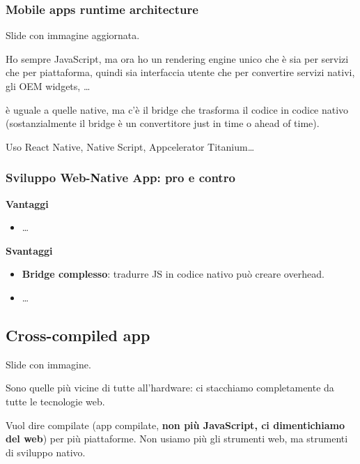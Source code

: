\subsubsection{Mobile apps runtime architecture}
\par Slide con immagine aggiornata. 
\par Ho sempre JavaScript, ma ora ho un rendering engine unico che è sia per servizi che per piattaforma, quindi sia interfaccia utente che per convertire servizi nativi, gli OEM widgets, \dots
\par è uguale a quelle native, ma c'è il bridge che trasforma il codice in codice nativo (sostanzialmente il bridge è un convertitore just in time o ahead of time).
\par Uso React Native, Native Script, Appcelerator Titanium\dots

\subsubsection{Sviluppo Web-Native App: pro e contro}
\par \textbf{Vantaggi}
\begin{itemize}
    \item \dots
\end{itemize}
\par \textbf{Svantaggi}
\begin{itemize}
    \item \textbf{Bridge complesso}: tradurre JS in codice nativo può creare overhead.
    \item \dots
\end{itemize}

\subsection{Cross-compiled app}
\par Slide con immagine.
\par Sono quelle più vicine di tutte all'hardware: ci stacchiamo completamente da tutte le tecnologie web.
\par Vuol dire compilate (app compilate, \textbf{non più JavaScript, ci dimentichiamo del web}) per più piattaforme. Non usiamo più gli strumenti web, ma strumenti di sviluppo nativo.

